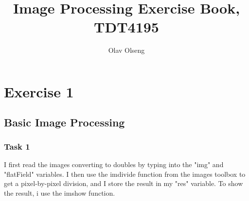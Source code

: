 \documentclass{article}
\begin{document}
\title{Image Processing Exercise Book, TDT4195}
\author{Olav Olseng}
\maketitle
\newpage


\section*{Exercise 1}
\subsection*{Basic Image Processing}
\subsubsection*{Task 1}
I first read the images converting to doubles by typing into the "img" and "flatField" variables. I then use the imdivide function from the images toolbox to get a pixel-by-pixel division, and I store the result in my "res" variable. To show the result, i use the imshow function.
\end{document}
